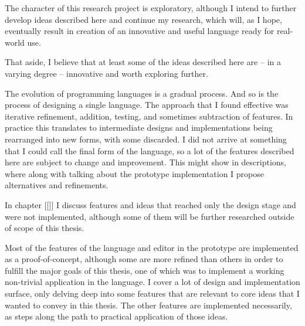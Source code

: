 The character of this research project is exploratory, although I intend to further develop ideas described here and continue my research, which will, as I hope, eventually result in creation of an innovative and useful language ready for real-world use.

That aside, I believe that at least some of the ideas described here are -- in a varying degree -- innovative and worth exploring further.

The evolution of programming languages is a gradual process. And so is the process of designing a single language. The approach that I found effective was iterative refinement, addition, testing, and sometimes subtraction of features. In practice this translates to intermediate designs and implementations being rearranged into new forms, with some discarded. I did not arrive at something that I could call the final form of the language, so a lot of the features described here are subject to change and improvement. This might show in descriptions, where along with talking about the prototype implementation I propose alternatives and refinements.

In chapter [[]] I discuss features and ideas that reached only the design stage and were not implemented, although some of them will be further researched outside of scope of this thesis.

Most of the features of the language and editor in the prototype are implemented as a proof-of-concept, although some are more refined than others in order to fulfill the major goals of this thesis, one of which was to implement a working non-trivial application in the language. I cover a lot of design and implementation surface, only delving deep into some features that are relevant to core ideas that I wanted to convey in this thesis. The other features are implemented necessarily, as steps along the path to practical application of those ideas.

